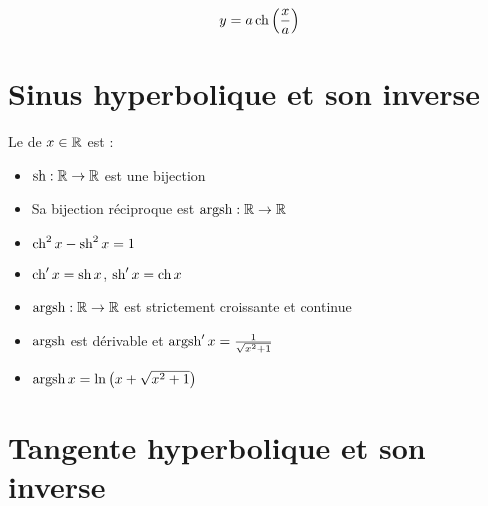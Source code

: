 \begin{frame}

$$y = a\mathop{\text{ch}}\nolimits \left( \frac x a \right)$$

\end{frame}

\section{Sinus hyperbolique et son inverse}

\begin{frame}
Le  de $x\in \mathbb{R}$ est :
\pause  
\bigskip
\begin{itemize}
  \item $\mathop{\text{sh}}\nolimits : \mathbb{R} \to \mathbb{R}$ est une bijection
 \pause  
  \item Sa bijection réciproque est $\mathop{\text{argsh}}\nolimits : \mathbb{R} \to \mathbb{R}$
\end{itemize}
\pause  
{}
\end{frame}

\begin{frame}
\end{frame}


\begin{frame}
\begin{proposition}
\begin{itemize}  \setlength{\itemsep}{7pt} 
  \item $\mathop{\text{ch}}\nolimits^2 x - \mathop{\text{sh}}\nolimits^2 x =1$
\pause  
  \item $\mathop{\text{ch}}\nolimits' x = \mathop{\text{sh}}\nolimits x$, \quad $\mathop{\text{sh}}\nolimits'x = \mathop{\text{ch}}\nolimits x$
\pause  
  \item $\mathop{\text{argsh}}\nolimits : \mathbb{R} \to \mathbb{R}$ est strictement croissante et continue
\pause  
  \item $\mathop{\text{argsh}}\nolimits$ est dérivable  et $\mathop{\text{argsh}}\nolimits'x=\frac{1}{\sqrt{x^2+1}}$
\pause  
  \item $\mathop{\text{argsh}}\nolimits x = \ln\big(x+ \sqrt{x^2+1}\big)$
\end{itemize}  
\end{proposition}
\end{frame}



\section{Tangente hyperbolique et son inverse}

